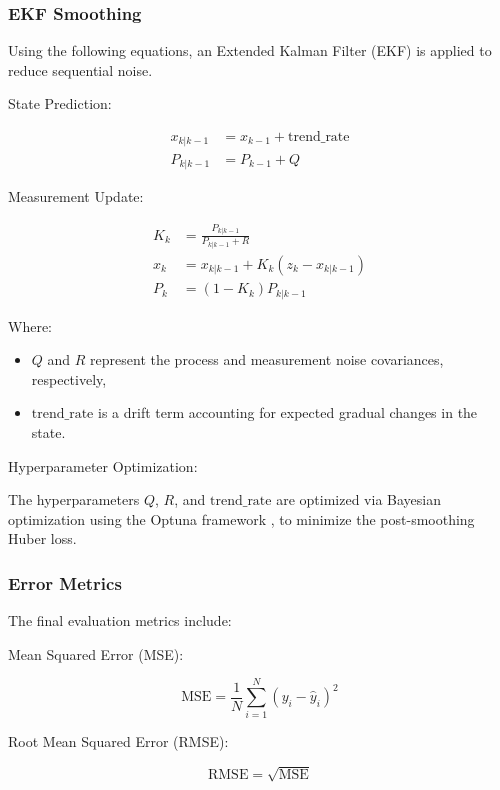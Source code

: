 \subsubsection{EKF Smoothing}
Using the following equations, an Extended Kalman Filter (EKF) is applied to reduce sequential noise.

State Prediction:

\begin{align}
x_{k|k-1} &= x_{k-1} + \text{trend\_rate} \\
P_{k|k-1} &= P_{k-1} + Q
\end{align}

Measurement Update:

\begin{align}
K_k &= \frac{P_{k|k-1}}{P_{k|k-1} + R} \\
x_k &= x_{k|k-1} + K_k (z_k - x_{k|k-1}) \\
P_k &= (1 - K_k) P_{k|k-1}
\end{align}

Where:
\begin{itemize}
    \item \( Q \) and \( R \) represent the process and measurement noise covariances, respectively,
    \item \( \text{trend\_rate} \) is a drift term accounting for expected gradual changes in the state.
\end{itemize}

Hyperparameter Optimization:

The hyperparameters \( Q \), \( R \), and \( \text{trend\_rate} \) are optimized via Bayesian optimization using the Optuna framework \cite{akiba2019optunanextgenerationhyperparameteroptimization}, to minimize the post-smoothing Huber loss.

\subsubsection{Error Metrics}
The final evaluation metrics include:

Mean Squared Error (MSE):

\begin{equation}
\text{MSE} = \frac{1}{N} \sum_{i=1}^{N} (y_i - \hat{y}_i)^2
\end{equation}

Root Mean Squared Error (RMSE):

\begin{equation}
\text{RMSE} = \sqrt{\text{MSE}}
\end{equation}

